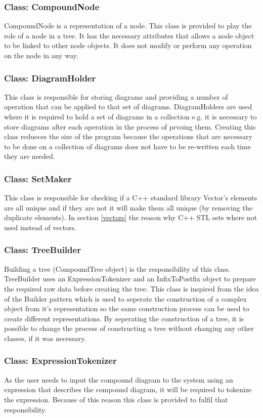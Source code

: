 \documentclass[10pt, a4paper, titlepage]{article}
\begin{document}
\subsubsection{Class: CompoundNode}
CompoundNode is a representation of a node. This class is provided to play the role of a node in a tree. It has the necessary attributes that allows a node object to be linked to other node objects. It does not modify or perform any operation on the node in any way.

\subsubsection{Class: DiagramHolder}
This class is responsible for storing diagrams and providing a number of operation that can be applied to that set of diagrams. DiagramHolders are used where it is required to hold a set of diagrams in a collection e.g. it is necessary to store diagrams after each operation in the process of prvoing them. Creating this class redueces the size of the program because the operations that are necessary to be done on a collection of diagrams does not have to be re-written each time they are needed.

\subsubsection{Class: SetMaker}
This class is responsible for checking if a C++ standard library Vector's elements are all unique and if they are not it will make them all unique (by removing the duplicate elements). In section \ref{vectors} the reason why C++ STL sets where not used instead of vectors. 

\subsubsection{Class: TreeBuilder}
Building a tree (CompoundTree object) is the responsibility of this class. TreeBuilder uses an ExpressionTokenizer and an InfixToPostfix object to prepare the required raw data before creating the tree. This class is inspired from the idea of the Builder pattern which is used to seperate the construction of a complex object from it's representation so the same construction process can be used to create different representations. By seperating the construction of a tree, it is possible to change the process of constructing a tree without changing any other classes, if it was necessary.

\subsubsection{Class: ExpressionTokenizer}
As the user needs to input the compound diagram to the system using an expression that describes the compound diagram, it will be required to tokenize the expression. Because of this reason this class is provided to fulfil that responsibility.
\end{document}
